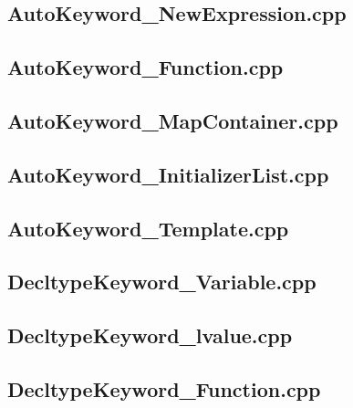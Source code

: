 \documentclass[11pt]{report}
\begin{document}
\begin{appendix}
\subsection{AutoKeyword\_NewExpression.cpp}
\label{AutoKeyword_NewExpression}


\subsection{AutoKeyword\_Function.cpp}
\label{AutoKeyword_Function}


\subsection{AutoKeyword\_MapContainer.cpp}
\label{AutoKeyword_MapContainer}


\subsection{AutoKeyword\_InitializerList.cpp}
\label{AutoKeyword_InitializerList}


\subsection{AutoKeyword\_Template.cpp}
\label{AutoKeyword_Template}


\subsection{DecltypeKeyword\_Variable.cpp}
\label{DecltypeKeyword_Variable}


\subsection{DecltypeKeyword\_lvalue.cpp}
\label{DecltypeKeyword_lvalue}


\subsection{DecltypeKeyword\_Function.cpp}
\label{DecltypeKeyword_Function}



\end{appendix}
\end{document}

